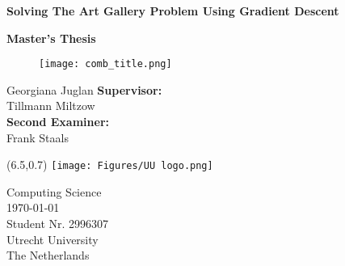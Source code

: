 \documentclass{article}
\begin{document}

\thispagestyle{empty} 
\begin{center}
    \vspace*{0.5cm}
    \huge
    \textbf{Solving The Art Gallery Problem Using Gradient Descent}

    \vspace*{0.4cm}
    \LARGE
    \textbf{Master's Thesis}
    \vspace*{2cm}

    \begin{figure}[H]
        \centering   
        \texttt{[image: comb\_title.png]}
    \end{figure}


    \vspace{-1cm}
    \LARGE
    Georgiana Juglan
    \vfill 
    \large    
    \textbf{Supervisor:} \\
    Tillmann Miltzow \\
    \textbf{Second Examiner:} \\
    Frank Staals \\
     
\end{center}
   

\begin{textblock}{3}(6.5,0.7)
\texttt{[image: Figures/UU logo.png]}
\end{textblock}

\begin{flushleft}
    \vspace{0.5cm}
    Computing Science\\
    \today\\
    Student Nr. 2996307 \\
    Utrecht University\\
    The Netherlands
\end{flushleft}

\newpage
\thispagestyle{empty}

\thispagestyle{empty}
\tableofcontents
\thispagestyle{empty}






\thispagestyle{empty}

\printbibliography

\renewcommand{\headrulewidth}{0pt}%
\fancyhead{}%

% 

%
\end{document}
